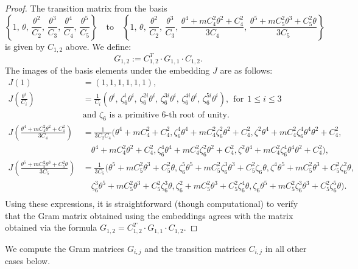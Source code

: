 \documentclass[table]{amsart}
\numberwithin{equation}{section}
\begin{document}
\begin{proof}
The transition matrix from the basis 
\[
\left\{ 1,\,\theta,\, \frac{\theta^2}{C_2},\, \frac{\theta^3}{C_3},\, \frac{\theta^4}{C_4},\, \frac{\theta^5}{C_5} \right\}
\quad \text{to} \quad
\left\{1,\, \theta,\, \frac{\theta^2}{C_2},\, \frac{\theta^3}{C_3},\, \frac{\theta^4+mC_4^2\theta^2+C_4^2}{3C_4},\, \frac{\theta^5 + m C_5^2 \theta^3 + C_5^2 \theta}{3 C_5} \right\}
\]
is given by $C_{1,2}$ above. We define:
\[
G_{1,2} := C_{1,2}^{T} \cdot G_{1,1} \cdot C_{1,2}.
\] 
The images of the basis elements under the embedding $J$ are as follows:
\begin{align*}
J(1)&=(1,1,1,1,1,1),\\
J\left(\frac{\theta^{i}}{C_{i}}\right) &= \frac{1}{C_{i}} \left( \theta^i,\, \zeta_6^i \theta^i,\, \zeta_6^{2i} \theta^i,\, \zeta_6^{3i} \theta^i,\, \zeta_6^{4i} \theta^i,\, \zeta_6^{5i} \theta^i \right),~~\text{for}~~  1\leq i\leq 3  \\
&\text{and $\zeta_6$ is a primitive $6$-th root of unity.}\\
J\left(\frac{\theta^4+mC_4^2\theta^2+C_4^2}{3C_4}\right)&=\frac{1}{3C_2C_4}(\theta^4+mC_4^2+C_4^2,  \zeta_6^4\theta^4+mC_4^2\zeta_6^2\theta^2+C_4^2,  \zeta^2\theta^4+mC_4^2\zeta_6^4\theta^4\theta^2+C_4^2, \\ & \quad \theta^4+mC_4^2\theta^2+C_4^2,\zeta_6^4\theta^4+mC_4^2\zeta_6^2\theta^2+C_4^2, \zeta^2\theta^4+mC_4^2\zeta_6^4\theta^4\theta^2+C_4^2 ), \\
J\left(\frac{\theta^5+mC_5^2\theta^3+C_5^2\theta}{3C_5}\right)&=\frac{1}{3C_5}(\theta^5+mC_5^2\theta^3+C_5^2\theta,\zeta_6^5\theta^5+mC_5^2\zeta_6^3\theta^3+C_5^2\zeta_6\theta,  \zeta^4\theta^5+mC_5^2\theta^3+C_5^2\zeta_6^2\theta, \\ & \quad\zeta_6^3\theta^5+mC_5^2\theta^3+C_5^2\zeta_6^3\theta,\zeta_6^2+mC_5^2\theta^3+C_5^2\zeta_6^4\theta , \zeta_6\theta^5+mC_5^2\zeta_6^3\theta^3+C_5^2\zeta_6^5\theta).\\
\end{align*}
Using these expressions, it is straightforward (though computational) to verify that the Gram matrix obtained using the embeddings agrees with the matrix obtained via the formula $G_{1,2} =  C_{1,2}^{T} \cdot G_{1,1} \cdot C_{1,2}.$
\end{proof}
\noindent We compute the Gram matrices $G_{i,j}$ and the transition matrices $C_{i,j}$ in all other cases below. 
\end{document}
